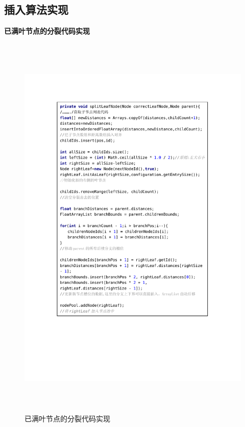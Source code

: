 \subsection{插入算法实现}
\textbf{已满叶节点的分裂代码实现}
\begin{figure}[H]
  \centering
  \includegraphics[width=6in,height=7.5in]{new_FIGs/chapter4/insert-code1.pdf}
  \caption{已满叶节点的分裂代码实现}\label{fullleafnode-split}
\end{figure}


